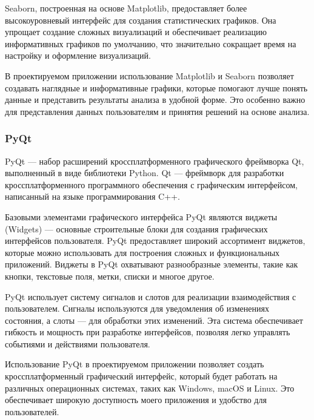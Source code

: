 Seaborn, построенная на основе Matplotlib, предоставляет более высокоуровневый интерфейс для создания статистических графиков. Она упрощает создание сложных визуализаций и обеспечивает реализацию информативных графиков по умолчанию, что значительно сокращает время на настройку и оформление визуализаций.

В проектируемом приложении использование Matplotlib и Seaborn позволяет создавать наглядные и информативные графики, которые помогают лучше понять данные и представить результаты анализа в удобной форме. Это особенно важно для представления данных пользователям и принятия решений на основе анализа.


\subsubsection{PyQt}

PyQt --- набор расширений кроссплатформенного графического фреймворка Qt, выполненный в виде библиотеки Python. Qt — фреймворк для разработки кроссплатформенного программного обеспечения с графическим интерфейсом, написанный на языке программирования C++.

Базовыми элементами графического интерфейса PyQt являются виджеты (Widgets) — основные строительные блоки для создания графических интерфейсов пользователя. PyQt предоставляет широкий ассортимент виджетов, которые можно использовать для построения сложных и функциональных приложений. Виджеты в PyQt охватывают разнообразные элементы, такие как кнопки, текстовые поля, метки, списки и многое другое. 

PyQt использует систему сигналов и слотов для реализации взаимодействия с пользователем. Сигналы используются для уведомления об изменениях состояния, а слоты — для обработки этих изменений. Эта система обеспечивает гибкость и мощность при разработке интерфейсов, позволяя легко управлять событиями и действиями пользователя.

Использование PyQt в проектируемом приложении позволяет создать кроссплатформенный графический интерфейс, который будет работать на различных операционных системах, таких как Windows, macOS и Linux. Это обеспечивает широкую доступность моего приложения и удобство для пользователей.

